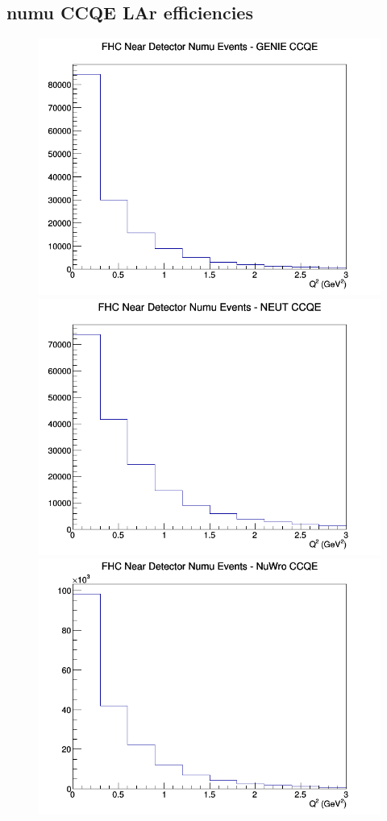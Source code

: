 \subsection{numu CCQE LAr efficiencies}
\begin{figure}[h]
\includegraphics[width=\linewidth]{eff_Q2/LAr/CCQE_FHC_ND_numu_Q2_GENIE.png}
\endminipage
{}
\includegraphics[width=\linewidth]{eff_Q2/LAr/CCQE_FHC_ND_numu_Q2_NEUT.png}
\endminipage
{}
\includegraphics[width=\linewidth]{eff_Q2/LAr/CCQE_FHC_ND_numu_Q2_NuWro.png}

\end{figure}
